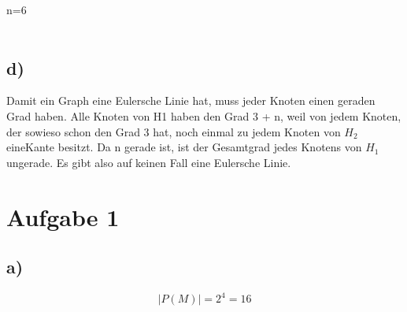 \documentclass{article}
\begin{document}
   n=6\\
   \\


	\subsection*{d)}

	Damit ein Graph eine Eulersche Linie hat, muss jeder Knoten einen geraden
	Grad haben.
	Alle Knoten von H1 haben den Grad 3 + n, weil von jedem Knoten, der
	sowieso schon den Grad 3 hat, noch einmal zu jedem Knoten von $H_2$ eineKante besitzt. Da n gerade ist, ist der Gesamtgrad jedes Knotens von $H_1$
	ungerade. Es gibt also auf keinen Fall eine Eulersche Linie.

\section*{Aufgabe 1}
	\subsection*{a)}

	\[|P(M)|=2^4=16\]
\end{document}
